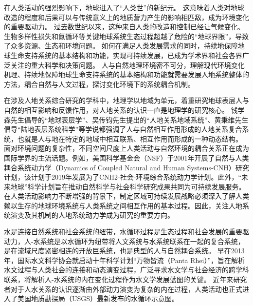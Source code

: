 
在人类活动的强烈影响下，地球进入了“人类世”的新纪元。
这意味着人类对地球改造的程度和后果可以与传统意义上的地质营力产生的影响相匹敌，成为环境变化的重要驱动力\cite{lenton2019, lewis2015, lewis2018}。
过去数世纪以来，这种来自人类的改造和控制已经让气候变化、生物多样性损失和氮循环等关键地球系统生态过程超越了危险的“地球界限”，导致了众多资源、生态和环境问题\cite{steffen2015}。
如何在满足人类发展需求的同时，持续地保障地球生命支持系统的基本结构和功能，实现可持续发展，已成为学术界和社会各界广泛关注的重大科学和决策问题\cite{wu2014}。
人与自然地理环境密不可分，理解现代环境变化机理、持续地保障地球生命支持系统的基本结构和功能就需要发展人地系统整体的方法，耦合自然与人文过程，探讨变化环境下的系统耦合机制\cite{fu2015}。

在涉及人地关系综合研究的学科中，地理学以地域为单元，着重研究地球表层人与自然的相互影响和反馈作用，对人地关系的认识一直是地理学的研究核心\cite{wu1991}。
钱学森先生倡导的“地球表层学”、吴传钧先生提出的“人地关系地域系统”、黄秉维先生倡导“陆地表层系统科学”等学说都强调了人与自然相互作用形成的人地关系复合系统，也就是人与地在特定的地域中相互联系、相互作用而形成的一种动态结构。
面对环境问题的复杂性，不同空间尺度上人类活动与自然环境的耦合关系正在成为国际学界的主流话题。例如，美国科学基金会（NSF）于2001年开展了自然与人类耦合系统动力学（Dynamics of Coupled Natural and Human Systems-CNH）研究计划，该计划于2019年发展为了CNH2-社会-环境综合系统动力学计划。此外，“未来地球”科学计划旨在推动自然科学与社会科学研究成果共同为可持续发展服务\cite{fu2015}。
在人类活动影响力不断增强的背景下，制定区域可持续发展战略必须深入了解人类赖以生存的地球环境系统与人类系统之间相互作用的基本过程。因此，关注人地系统演变及其机制的人地系统动力学成为研究的重要方向\cite{fu2022}。


水是连接自然系统和社会系统的纽带，水循环过程是生态过程和社会发展的重要驱动力，人-水系统是以水循环为纽带将人文系统与水系统联系在一起的复合系统，是在流域尺度紧密相连的开放巨系统，也是典型的人与自然耦合系统\cite{li2007}。
早在2013年，国际水文科学协会就启动十年科学计划“万物皆流（Panta Rhei）”，旨在解析水文过程与人类社会的连接和动态演变过程\cite{montanari2013}，广泛寻求水文学与社会经济的跨学科联系，将解析人-水系统的内在变化过程作为水文学发展蓝图的关键。
近年来研究者对于人水关系的认识逐渐由外部动力演变为复杂的内在过程，人类活动也正式进入了美国地质勘探局（USGS）最新发布的水循环示意图\cite{abbott2019, abbott2019a}。

